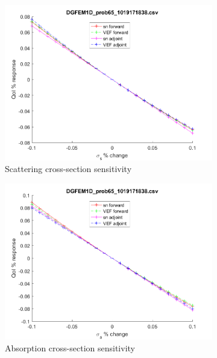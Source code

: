 \documentclass{article}
\begin{document}
\begin{figure}[H]
\begin{subfigure}{.5\textwidth}
  \includegraphics[width=.98\linewidth]{IanProposal/figures2/65sigsSens.png}
  \caption{Scattering cross-section sensitivity}
  \label{fig:sfig2}
\end{subfigure}%
\begin{subfigure}{.5\textwidth}
  \centering
  \includegraphics[width=.98\linewidth]{IanProposal/figures2/65sigaSens.png}
  \caption{Absorption cross-section sensitivity}
  \label{fig:sfig5}
\end{subfigure}%
\caption{}
\label{fig:fig}
\end{figure}
\newpage

\end{document}
